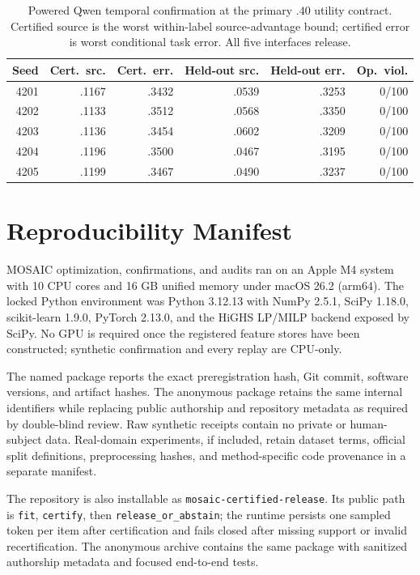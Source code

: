\begin{table}[t]
\centering
\scriptsize
\setlength{\tabcolsep}{3.5pt}
\begin{tabular}{rrrrrr}
\hline
Seed & Cert.\ src. & Cert.\ err. & Held-out src. & Held-out err. & Op.\ viol.\\
\hline
4201 & .1167 & .3432 & .0539 & .3253 & 0/100\\
4202 & .1133 & .3512 & .0568 & .3350 & 0/100\\
4203 & .1136 & .3454 & .0602 & .3209 & 0/100\\
4204 & .1196 & .3500 & .0467 & .3195 & 0/100\\
4205 & .1199 & .3467 & .0490 & .3237 & 0/100\\
\hline
\end{tabular}
\caption{Powered Qwen temporal confirmation at the primary $.40$ utility
contract. Certified source is the worst within-label source-advantage bound;
certified error is worst conditional task error. All five interfaces release.}
\label{supp:tab:qwen-powered}
\end{table}

\section{Reproducibility Manifest}

MOSAIC optimization, confirmations, and audits ran on an Apple M4 system with
10 CPU cores and 16 GB unified memory under macOS 26.2 (arm64). The locked
Python environment was Python 3.12.13 with NumPy 2.5.1, SciPy 1.18.0,
scikit-learn 1.9.0, PyTorch 2.13.0, and the HiGHS LP/MILP backend exposed by
SciPy. No GPU is
required once the registered feature stores have been constructed; synthetic
confirmation and every replay are CPU-only.

The named package reports the exact preregistration hash, Git commit, software
versions, and artifact hashes. The anonymous package retains the same internal
identifiers while replacing public authorship and repository metadata as
required by double-blind review. Raw synthetic receipts contain no private or
human-subject data. Real-domain experiments, if included, retain dataset terms,
official split definitions, preprocessing hashes, and method-specific code
provenance in a separate manifest.

The repository is also installable as \texttt{mosaic-certified-release}. Its
public path is \texttt{fit}, \texttt{certify}, then
\texttt{release\_or\_abstain}; the runtime persists one sampled token per item
after certification and fails closed after missing support or invalid
recertification. The anonymous archive contains the same package with sanitized
authorship metadata and focused end-to-end tests.

